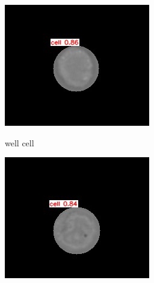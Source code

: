 \begin{figure}[t]
	\begin{center}
		\begin{subfigure}[b]{0.25\textwidth}
			\includegraphics[width=\textwidth]{thesis-template-master/images/bestweightoncell.jpg}
			\label{fig:Debris}
			\caption{well cell}
		\end{subfigure}
		\begin{subfigure}[b]{0.25\textwidth}
			\includegraphics[width=\textwidth]{thesis-template-master/images/bestweightoncell2.jpg}

\end{subfigure}
\end{center}
\end{figure}
